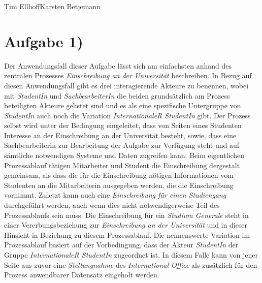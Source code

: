\documentclass{swp1}
\begin{document}
          {Tim Ellhoff}{Karsten Betjemann}{}
          
\section*{Aufgabe 1)}

Der Anwendungsfall dieser Aufgabe lässt sich am einfachsten anhand des zentralen Prozesses \textit{Einschreibung an der Universität} beschreiben.\newline
In Bezug auf diesen Anwendungsfall gibt es drei interagierende Akteure zu benennen, wobei mit \textit{StudentIn} und \textit{SachbearbeiterIn} die beiden grundsätzlich am Prozess beteiligten Akteure gelistet sind und es als eine spezifische Untergruppe von \textit{StudentIn} auch noch die Variation \textit{InternationaleR StudentIn} gibt.\newline
Der Prozess selbst wird unter der Bedingung eingeleitet, dass von Seiten eines Studenten Interesse an der Einschreibung an der Universität besteht, sowie, dass eine Sachbearbeiterin zur Bearbeitung der Aufgabe zur Verfügung steht und auf sämtliche notwendigen Systeme und Daten zugreifen kann.\newline
Beim eigentlichen Prozessablauf tätigen Mitarbeiter und Student die Einschreibung dergestalt gemeinsam, als dass die für die Einschreibung nötigen Informationen vom Studenten an die Mitarbeiterin ausgegeben werden, die die Einschreibung vornimmt. Zuletzt kann auch eine \textit{Einschreibung für einen Studiengang} durchgeführt werden, auch wenn dies nicht notwendigerweise Teil des Prozessablaufs sein muss. Die Einschreibung für ein \textit{Studium Generale} steht in einer Vererbungsbeziehung zur \textit{Einschreibung an der Universität} und in dieser Hinsicht in Beziehung zu diesem Prozessablauf.\newline
Die nennenswerte Variation im Prozessablauf basiert auf der Vorbedingung, dass der Akteur \textit{StudentIn} der Gruppe \textit{InternationaleR StudentIn} zugeordnet ist. In diesem Falle kann von jener Seite aus zuvor eine \textit{Stellungnahme} des \textit{International Office} als zusätzlich für den Prozess anwendbarer Datensatz eingeholt werden.
\end{document}
